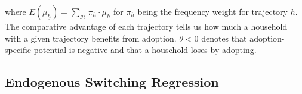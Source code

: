 \documentclass[11pt]{article}
\begin{document}
where $E(\mu_{\underline{h}}) = \sum_{\mathcal{H}} \pi_h \cdot \mu_h$ for $\pi_h$ being the frequency weight for trajectory $h$. The comparative advantage of each trajectory tells us how much a household with a given trajectory benefits from adoption. $\theta <0 $ denotes that adoption-specific potential is negative and that a household loses by adopting.





\subsection{Endogenous Switching Regression}
\end{document}
